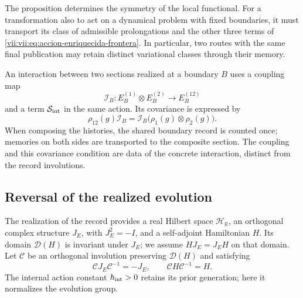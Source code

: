 The proposition determines the symmetry of the local functional. For a
transformation also to act on a dynamical problem with fixed boundaries,
it must transport its class of admissible prolongations and the other three
terms of \eqref{vii:vii:eq:accion-enriquecida-frontera}. In particular, two
routes with the same final publication may retain distinct variational
classes through their memory.

An interaction between two sections realized at a boundary \(B\)
uses a coupling map
\[
 \mathcal I_B:E_B^{(1)}\otimes E_B^{(2)}\longrightarrow E_B^{(12)}
\]
and a term \(\mathcal S_{\rm int}\) in the same action. Its covariance
is expressed by
\[
 \rho_{12}(g)\mathcal I_B
 =\mathcal I_B\bigl(\rho_1(g)\otimes\rho_2(g)\bigr).
\]
When composing the histories, the shared boundary record is counted
once; memories on both sides are transported to the composite section.
The coupling and this covariance condition are data of the concrete
interaction, distinct from the record involutions.

\subsection{Reversal of the realized evolution}
\label{vii:vii:subsec:reversion-evolucion}

The realization of the record provides a real Hilbert space
\(\mathcal H_{\mathbb R}\), an orthogonal complex structure
\(J_E\), with \(J_E^2=-I\), and a self-adjoint Hamiltonian \(H\).
Its domain \(\mathcal D(H)\) is invariant under \(J_E\); we assume
\(HJ_E=J_EH\) on that domain. Let \(\mathcal C\) be an orthogonal
involution preserving \(\mathcal D(H)\) and satisfying
\begin{equation}
 \mathcal C J_E\mathcal C^{-1}=-J_E,\qquad
 \mathcal C H\mathcal C^{-1}=H.
 \label{vii:vii:eq:dominio-reversion-evolucion}
\end{equation}
The internal action constant \(\hbar_{\rm int}>0\) retains its
prior generation; here it normalizes the evolution group.

